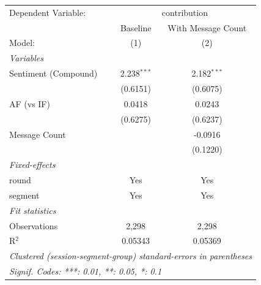
\begingroup
\centering
\begin{tabular}{lcc}
   \tabularnewline \midrule \midrule
   Dependent Variable: & \multicolumn{2}{c}{contribution}\\
                        & Baseline      & With Message Count \\   
   Model:               & (1)           & (2)\\  
   \midrule
   \emph{Variables}\\
   Sentiment (Compound) & 2.238$^{***}$ & 2.182$^{***}$\\   
                        & (0.6151)      & (0.6075)\\   
   AF (vs IF)           & 0.0418        & 0.0243\\
                        & (0.6275)      & (0.6237)\\   
   Message Count        &               & -0.0916\\   
                        &               & (0.1220)\\   
   \midrule
   \emph{Fixed-effects}\\
   round                & Yes           & Yes\\  
   segment              & Yes           & Yes\\  
   \midrule
   \emph{Fit statistics}\\
   Observations         & 2,298         & 2,298\\  
   R$^2$                & 0.05343       & 0.05369\\  
   \midrule \midrule
   \multicolumn{3}{l}{\emph{Clustered (session-segment-group) standard-errors in parentheses}}\\
   \multicolumn{3}{l}{\emph{Signif. Codes: ***: 0.01, **: 0.05, *: 0.1}}\\
\end{tabular}
\par\endgroup


